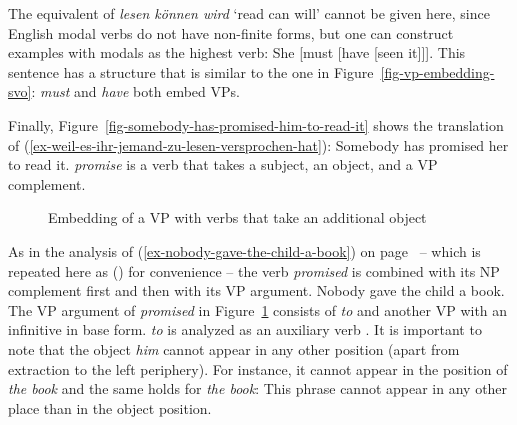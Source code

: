 The equivalent of \emph{lesen können wird} `read can will' cannot be given here, since English modal
verbs do not have non-finite forms, but one can construct examples with modals as the highest verb:
\ea
She [must [have [seen it]]].
\z
This sentence has a structure that is similar to the one in Figure~\ref{fig-vp-embedding-svo}:
\emph{must} and \emph{have} both embed VPs.

Finally, Figure~\vref{fig-somebody-has-promised-him-to-read-it} shows the translation of
(\ref{ex-weil-es-ihr-jemand-zu-lesen-versprochen-hat}):
\ea
Somebody has promised her to read it.
\z
\emph{promise} is a verb that takes a subject, an object, and a VP complement. 
\begin{figure}
\caption{\label{fig-somebody-has-promised-him-to-read-it}Embedding of a VP with verbs that take an
  additional object}
\end{figure}
As in the analysis of (\ref{ex-nobody-gave-the-child-a-book}) on
page~\pageref{ex-nobody-gave-the-child-a-book} -- which is repeated here as () for convenience
-- the verb \emph{promised} is combined with its NP complement first and then with its VP
argument.
\ea
\label{ex-nobody-gave-the-child-a-book-three}
Nobody gave the child a book.
\z 
The VP argument of \emph{promised} in Figure~\ref{fig-somebody-has-promised-him-to-read-it} consists of \emph{to} and another VP with an infinitive in base form. \emph{to} is
analyzed as an auxiliary verb \parencites[]{GPS82a-u}[]{Sag2020a}.
It is important to note that the object \emph{him} cannot appear in any other position (apart from
extraction to the left periphery). For instance, it cannot appear in the position of \emph{the book}
and the same holds for \emph{the book}: This phrase cannot appear in any other place than in the
object position.



